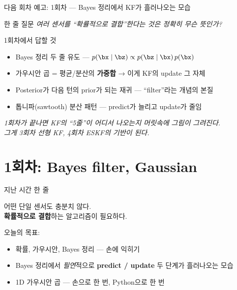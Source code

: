 \begin{frame}{다음 회차 예고: 1회차 — Bayes 정리에서 KF가 흘러나오는 모습}
  \begin{block}{한 줄 질문}
    \large
    \emph{여러 센서를 ``확률적으로 결합''한다는 것은 정확히 무슨 뜻인가?}
  \end{block}

  \pause
  \vspace{0.3em}
  \begin{exampleblock}{1회차에서 답할 것}
    \begin{itemize}
      \item Bayes 정리 두 줄 유도 — $p(\bx \mid \bz) \propto p(\bz \mid \bx)\,p(\bx)$
      \item 가우시안 곱 = 평균/분산의 \textbf{가중합} → 이게 KF의 update 그 자체
      \item \alert{Posterior가 다음 턴의 prior가 되는 재귀} — ``filter''라는 개념의 본질
      \item 톱니파(sawtooth) 분산 패턴 — predict가 늘리고 update가 줄임
    \end{itemize}
  \end{exampleblock}

  \pause
  \vspace{0.3em}
  \begin{center}\small\itshape
    \color{gray}
    1회차가 끝나면 KF의 ``5줄''이 어디서 나오는지 머릿속에 그림이 그려진다.\\
    그게 3회차 선형 KF, 4회차 ESKF의 기반이 된다.
  \end{center}
\end{frame}

\section{1회차: Bayes filter, Gaussian}


\begin{frame}{지난 시간 한 줄}
  \begin{center}
    \large
    어떤 단일 센서도 충분치 않다.\\
    \textbf{확률적으로 결합}하는 알고리즘이 필요하다.
  \end{center}
  \vspace{0.6em}
  오늘의 목표:
  \begin{itemize}
    \item 확률, 가우시안, Bayes 정리 — 손에 익히기
    \item Bayes 정리에서 \emph{필연}적으로 \textbf{predict / update} 두 단계가 흘러나오는 모습
    \item 1D 가우시안 곱 — 손으로 한 번, Python으로 한 번
  \end{itemize}
\end{frame}

